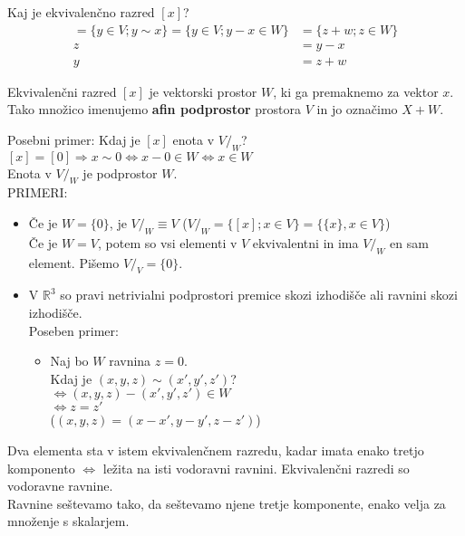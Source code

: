 \documentclass[a4paper,12pt]{article}
\begin{document}
Kaj je ekvivalenčno razred $[x]$? \\
\begin{align*}
[x]=\{y\in V; y\sim x\}=\{y\in V; y-x\in W\}&=\{z+w;z\in W\}\\
z&=y-x \\
y&=z+w
\end{align*}

Ekvivalenčni razred $[x]$ je vektorski prostor $W$, ki ga premaknemo za vektor $x$. Tako množico imenujemo \textbf{afin podprostor} prostora $V$ in jo označimo $X+W$.

\newpage

Posebni primer: Kdaj je $[x]$ enota v $V/_W$? \\

$[x]=[0]\Rightarrow x\sim 0 \Leftrightarrow x-0 \in W \Leftrightarrow x\in W$ \\

Enota v $V/_W$ je podprostor $W$. \\

PRIMERI:
\begin{itemize}
	\item Če je $W=\{0\}$, je $V/_W \equiv V$ ($V/_W=\{[x];x\in V\}=\{\{x\},x\in V\}$) \\
	Če je $W=V$, potem so vsi elementi v $V$ ekvivalentni in ima $V/_W$ en sam element. Pišemo $V/_V=\{0\}$.
	\item V $\mathbb{R}^3$ so pravi netrivialni podprostori premice skozi izhodišče ali ravnini skozi izhodišče. \\
	Poseben primer: 
	\begin{itemize}
		\item Naj bo $W$ ravnina $z=0$. \\
		Kdaj je $(x,y,z)\sim(x',y',z')$? \\
		$\Leftrightarrow (x,y,z)-(x',y',z')\in W$ \\
		$\Leftrightarrow z=z'$ \\
		($(x,y,z)=(x-x',y-y',z-z')$)\\
	\end{itemize}
\end{itemize}

Dva elementa sta v istem ekvivalenčnem razredu, kadar imata enako tretjo komponento $\Leftrightarrow$ ležita na isti vodoravni ravnini. Ekvivalenčni razredi so vodoravne ravnine.\\

Ravnine seštevamo tako, da seštevamo njene tretje komponente, enako velja za množenje s skalarjem.\\
\end{document}
